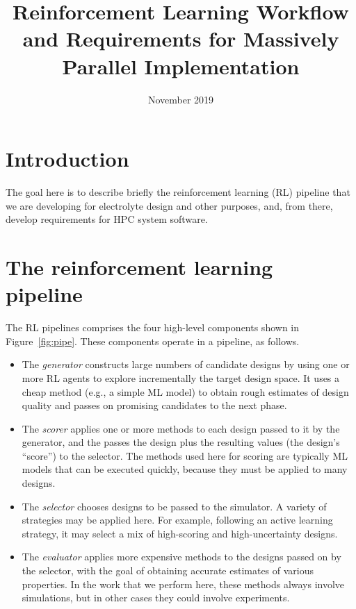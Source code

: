 \documentclass[10pt]{article}
\title{Reinforcement Learning Workflow and Requirements for Massively Parallel Implementation}
\date{November 2019}
\begin{document}
\maketitle

\section{Introduction}

The goal here is to describe briefly the reinforcement learning (RL) pipeline that we are developing for electrolyte design and other purposes,
and, from there, develop requirements for HPC system software.


\section{The reinforcement learning pipeline}\label{sec:overview} 


The RL pipelines comprises the four high-level components shown in Figure~\ref{fig:pipe}. These components operate in a pipeline, as follows.

\begin{itemize}
\itemsep-0.2em 
\item
The \emph{generator} constructs large numbers of candidate designs by using one or more RL agents to explore incrementally the target design space.
It uses a cheap method (e.g., a simple ML model) to obtain rough estimates of design quality and passes on promising candidates to the next phase.

\item
The \emph{scorer} applies one or more methods to each design passed to it by the generator, 
and the passes the design plus the resulting values (the design's ``score'') to the selector. 
The methods used here for scoring are typically ML models that can be executed quickly, because they must be applied to many designs.

\item
The \emph{selector} chooses designs to be passed to the simulator.
A variety of strategies may be applied here. 
For example, following an active learning strategy, it may select a mix of high-scoring and high-uncertainty designs.

\item
The \emph{evaluator} applies more expensive methods to the designs passed on by the selector, 
with the goal of obtaining accurate estimates of various properties. 
In the work that we perform here, these methods always involve simulations, but in other cases they could involve experiments.

\end{itemize}
\end{document}
